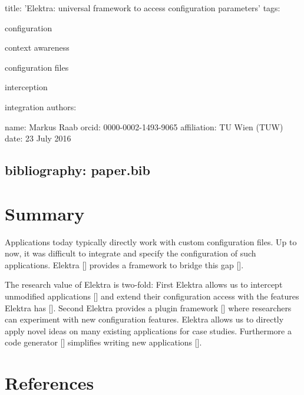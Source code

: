 

 title\+: 'Elektra\+: universal framework to access configuration parameters' tags\+:
\begin{DoxyItemize}
\item configuration
\item context awareness
\item configuration files
\item interception
\item integration authors\+:
\end{DoxyItemize}

name\+: Markus Raab orcid\+: 0000-\/0002-\/1493-\/9065 affiliation\+: T\+U Wien (T\+U\+W) date\+: 23 July 2016 \subsection*{bibliography\+: paper.\+bib }\hypertarget{md_doc_paper_paper_doc_paper_paper_md}{}\section{Summary}\label{md_doc_paper_paper_doc_paper_paper_md}
Applications today typically directly work with custom configuration files. Up to now, it was difficult to integrate and specify the configuration of such applications. Elektra \mbox{[}\mbox{]} provides a framework to bridge this gap \mbox{[}\mbox{]}.

The research value of Elektra is two-\/fold\+: First Elektra allows us to intercept unmodified applications \mbox{[}\mbox{]} and extend their configuration access with the features Elektra has \mbox{[}\mbox{]}. Second Elektra provides a plugin framework \mbox{[}\mbox{]} where researchers can experiment with new configuration features. Elektra allows us to directly apply novel ideas on many existing applications for case studies. Furthermore a code generator \mbox{[}\mbox{]} simplifies writing new applications \mbox{[}\mbox{]}.

\section*{References}